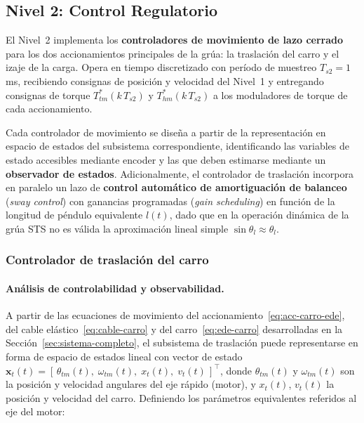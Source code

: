 \documentclass[12pt, a4paper]{article}
\begin{document}
\subsection{Nivel 2: Control Regulatorio}

El Nivel~2 implementa los \textbf{controladores de movimiento de lazo cerrado} para los dos
accionamientos principales de la grúa: la traslación del carro y el izaje de la carga. Opera
en tiempo discretizado con período de muestreo $T_{s2} = 1$\,ms, recibiendo consignas de
posición y velocidad del Nivel~1 y entregando consignas de torque $T_{tm}^*(k\,T_{s2})$ y
$T_{hm}^*(k\,T_{s2})$ a los moduladores de torque de cada accionamiento.

Cada controlador de movimiento se diseña a partir de la representación en espacio de estados
del subsistema correspondiente, identificando las variables de estado accesibles mediante
encoder y las que deben estimarse mediante un \textbf{observador de estados}. Adicionalmente,
el controlador de traslación incorpora en paralelo un lazo de \textbf{control automático de
amortiguación de balanceo} (\textit{sway control}) con ganancias programadas (\textit{gain
scheduling}) en función de la longitud de péndulo equivalente $l(t)$, dado que en la
operación dinámica de la grúa STS no es válida la aproximación lineal simple
$\sin\theta_l \approx \theta_l$.

\subsubsection{Controlador de traslación del carro}
\label{subsubsec:ctrl-carro}

\paragraph{Análisis de controlabilidad y observabilidad.}

A partir de las ecuaciones de movimiento del accionamiento~\eqref{eq:acc-carro-ede},
del cable elástico~\eqref{eq:cable-carro} y del carro~\eqref{eq:ede-carro} desarrolladas
en la Sección~\ref{sec:sistema-completo}, el subsistema de traslación puede representarse
en forma de espacio de estados lineal con vector de estado
$\mathbf{x}_t(t) = [\,\theta_{tm}(t),\;\omega_{tm}(t),\;x_t(t),\;v_t(t)\,]^\top$,
donde $\theta_{tm}(t)$ y $\omega_{tm}(t)$ son la posición y velocidad angulares del eje rápido
(motor), y $x_t(t)$, $v_t(t)$ la posición y velocidad del carro. Definiendo los parámetros
equivalentes referidos al eje del motor:
\end{document}
